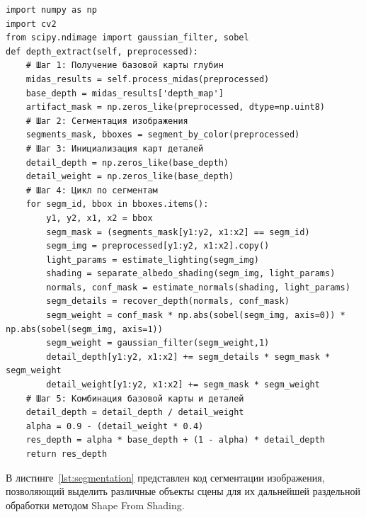 \begin{center}
    \begin{lstlisting}[label=lst:depth_extract,caption=Извлечение глубины из подготовленного изображения]
import numpy as np
import cv2
from scipy.ndimage import gaussian_filter, sobel
def depth_extract(self, preprocessed):
    # Шаг 1: Получение базовой карты глубин
    midas_results = self.process_midas(preprocessed)
    base_depth = midas_results['depth_map']
    artifact_mask = np.zeros_like(preprocessed, dtype=np.uint8)
    # Шаг 2: Сегментация изображения
    segments_mask, bboxes = segment_by_color(preprocessed)
    # Шаг 3: Инициализация карт деталей
    detail_depth = np.zeros_like(base_depth)
    detail_weight = np.zeros_like(base_depth)
    # Шаг 4: Цикл по сегментам
    for segm_id, bbox in bboxes.items():
        y1, y2, x1, x2 = bbox
        segm_mask = (segments_mask[y1:y2, x1:x2] == segm_id)
        segm_img = preprocessed[y1:y2, x1:x2].copy()
        light_params = estimate_lighting(segm_img)
        shading = separate_albedo_shading(segm_img, light_params)
        normals, conf_mask = estimate_normals(shading, light_params)
        segm_details = recover_depth(normals, conf_mask)
        segm_weight = conf_mask * np.abs(sobel(segm_img, axis=0)) * np.abs(sobel(segm_img, axis=1))
        segm_weight = gaussian_filter(segm_weight,1)
        detail_depth[y1:y2, x1:x2] += segm_details * segm_mask * segm_weight
        detail_weight[y1:y2, x1:x2] += segm_mask * segm_weight
    # Шаг 5: Комбинация базовой карты и деталей
    detail_depth = detail_depth / detail_weight
    alpha = 0.9 - (detail_weight * 0.4)
    res_depth = alpha * base_depth + (1 - alpha) * detail_depth
    return res_depth
    \end{lstlisting}
\end{center}

В листинге~\ref{lst:segmentation} представлен код сегментации изображения, позволяющий выделить различные объекты сцены для их дальнейшей раздельной обработки методом Shape From Shading.


